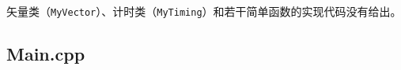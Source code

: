 \documentclass{article}
\begin{document}
		矢量类（\texttt{MyVector}）、计时类（\texttt{MyTiming}）和若干简单函数的实现代码没有给出。
		\linespread{1}
%		
%		
%		
%		
%		
%		
%		
		\subsection{Main.cpp}
		
\end{document}
